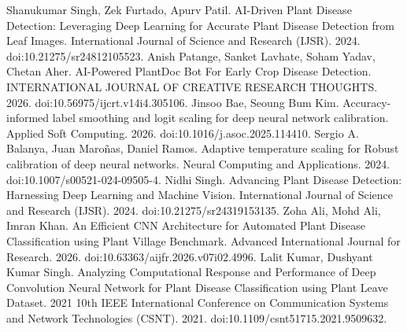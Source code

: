  Shanukumar Singh, Zek Furtado, Apurv Patil. AI-Driven Plant Disease Detection: Leveraging Deep Learning for Accurate Plant Disease Detection from Leaf Images. International Journal of Science and Research (IJSR). 2024. doi:10.21275/sr24812105523.
 Anish Patange, Sanket Lavhate, Soham Yadav, Chetan Aher. AI-Powered PlantDoc Bot For Early Crop Disease Detection. INTERNATIONAL JOURNAL OF CREATIVE RESEARCH THOUGHTS. 2026. doi:10.56975/ijcrt.v14i4.305106.
 Jinsoo Bae, Seoung Bum Kim. Accuracy-informed label smoothing and logit scaling for deep neural network calibration. Applied Soft Computing. 2026. doi:10.1016/j.asoc.2025.114410.
 Sergio A. Balanya, Juan Maroñas, Daniel Ramos. Adaptive temperature scaling for Robust calibration of deep neural networks. Neural Computing and Applications. 2024. doi:10.1007/s00521-024-09505-4.
 Nidhi Singh. Advancing Plant Disease Detection: Harnessing Deep Learning and Machine Vision. International Journal of Science and Research (IJSR). 2024. doi:10.21275/sr24319153135.
 Zoha Ali, Mohd Ali, Imran Khan. An Efficient CNN Architecture for Automated Plant Disease Classification using Plant Village Benchmark. Advanced International Journal for Research. 2026. doi:10.63363/aijfr.2026.v07i02.4996.
 Lalit Kumar, Dushyant Kumar Singh. Analyzing Computational Response and Performance of Deep Convolution Neural Network for Plant Disease Classification using Plant Leave Dataset. 2021 10th IEEE International Conference on Communication Systems and Network Technologies (CSNT). 2021. doi:10.1109/csnt51715.2021.9509632.

